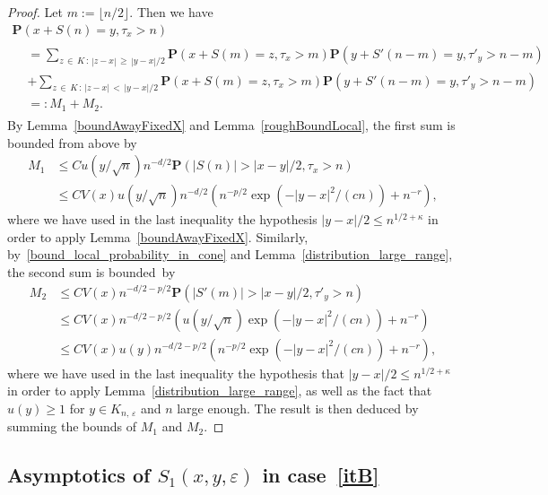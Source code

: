 \documentclass[10pt]{amsart}
\theoremstyle{definition}\newtheorem{defi}[theo]{Definition}\newtheorem{rema}[theo]{Remark}\newtheorem{exam}[theo]{Example}\newtheorem{exem}[theo]{Example}\newtheorem{nota}[theo]{Notation}
\newcommand{\pr}{\mathbf{P}}
\renewcommand{\epsilon}{\varepsilon}
\renewcommand{\leq}{\leqslant}
\renewcommand{\geq}{\geqslant}
\begin{document}
\begin{proof}
Let $m:=\lfloor n/2\rfloor$. Then we have
\begin{multline*}
\pr\left(x+S(n)=y,\tau_{x}>n\right)\\
\begin{aligned}
&=\sum_{z\,\in\,{K}\,:\,|z-x|\,\geq\,|y-x|/2}\pr\left(x+S(m)=z,\tau_{x}>m\right)\pr\left(y+S'(n-m)=y,\tau'_{y}>n-m\right)\\
&+\sum_{z\,\in\,{K}\,:\,|z-x|\,<\,| y-x|/2}\pr\left(x+S(m)=z,\tau_{x}>m\right)\pr\left(y+S'(n-m)=y,\tau'_{y}>n-m\right)\\
&=:M_{1}+M_{2}.
\end{aligned}
\end{multline*}
By Lemma~\ref{boundAwayFixedX} and Lemma~\ref{roughBoundLocal}, the first sum is bounded from above by
\begin{align*}
M_{1}&\leq Cu\left(y/\sqrt{n}\right)n^{-d/2}\pr\left(|S(n)|>| x-y|/2,\tau_{x}>n\right)\\
&\leq CV(x)u\left(y/\sqrt{n}\right)n^{-d/2}\left(n^{-p/2}\exp\left(-|y-x|^{2}/(c n)\right)+ n^{-r}\right),
\end{align*}
where we have used in the last inequality the hypothesis $| y-x|/2\leq n^{1/2+\kappa}$ in order to apply Lemma~\ref{boundAwayFixedX}. Similarly, by~\eqref{bound_local_probability_in_cone} and Lemma~\ref{distribution_large_range}, the second sum is bounded~by
\begin{align*}
M_{2}&\leq CV(x)n^{-d/2-p/2}\pr\left(\left|S'(m)\right|>|x-y|/2,\tau'_{y}>n\right)\\
&\leq CV(x)n^{-d/2-p/2}\left(u\left(y/\sqrt{n}\right)\exp\left(-|y-x|^{2}/(c n)\right)+ n^{-r}\right)\\
&\leq CV(x)u(y)n^{-d/2-p/2}\left(n^{-p/2}\exp\left(-|y-x|^{2}/(c n)\right)+ n^{-r}\right),
\end{align*}
where we have used in the last inequality the hypothesis that $|y-x|/2\leq n^{1/2+\kappa}$ in order to apply Lemma~\ref{distribution_large_range}, as well as the fact that $u(y)\geq 1$ for $y\in{K}_{n,\,\epsilon}$ and $n$ large enough. The result is then deduced by summing the bounds of $M_{1}$ and $M_{2}$.
\end{proof}



\subsection*{Asymptotics of \texorpdfstring{$S_1(x,y,\varepsilon)$}{S1(x,y, varepsilon)} in case~\eqref{itB}}
\end{document}
